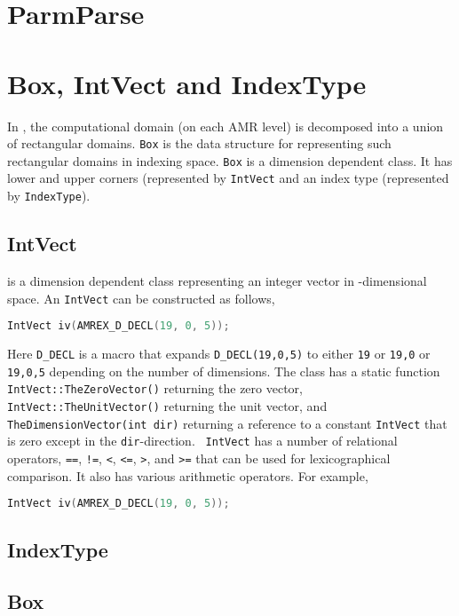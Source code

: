\section{ParmParse}

\section{Box, IntVect and IndexType}
\label{sec:basics:box}

In \amrex, the computational domain (on each AMR level) is decomposed
into a union of rectangular domains.  {\tt Box} is the data
structure for representing such rectangular domains in indexing space.
{\tt Box} is a dimension dependent class.  It has lower and upper
corners (represented by {\tt IntVect} and an index type
(represented by {\tt IndexType}).

\subsection{IntVect}

{} is a dimension dependent class representing an
integer vector in {}-dimensional space.  An
{\tt IntVect} can be constructed as follows,
\begin{lstlisting}[language=cpp]
    IntVect iv(AMREX_D_DECL(19, 0, 5));
\end{lstlisting}
Here {\tt D\_DECL} is a macro that expands {\tt D\_DECL(19,0,5)} to
either {\tt 19} or {\tt 19,0} or {\tt 19,0,5} depending on the number
of dimensions.  The class has a static function {\tt
  IntVect::TheZeroVector()} returning the zero vector, {\tt
  IntVect::TheUnitVector()} returning the unit vector, and {\tt
  TheDimensionVector(int dir)} returning a reference to a constant
{\tt IntVect} that is zero except in the {\tt dir}-direction.  {\tt
  IntVect} has a number of relational operators, {\tt ==}, {\tt !=},
{\tt <}, {\tt <=}, {\tt >}, and {\tt >=} that can be used for
lexicographical comparison.  It also has various arithmetic operators.
For example,
\begin{lstlisting}[language=cpp]
    IntVect iv(AMREX_D_DECL(19, 0, 5));
\end{lstlisting}


\subsection{IndexType}

\subsection{Box}

